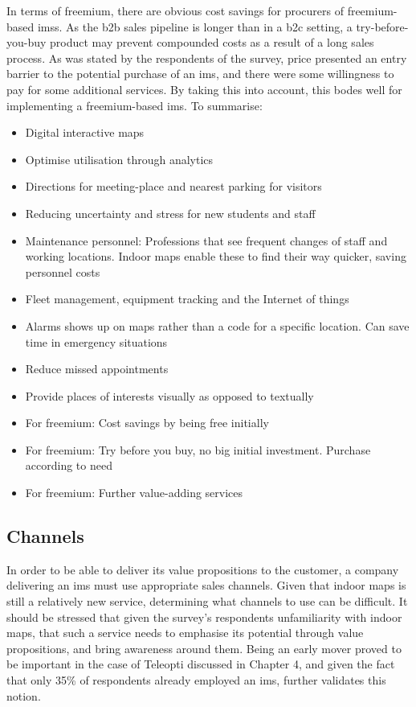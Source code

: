In terms of freemium, there are obvious cost savings for procurers of freemium-based \glspl{ims}. As the \gls{b2b} sales pipeline is longer than in a \gls{b2c} setting, a try-before-you-buy product may prevent compounded costs as a result of a long sales process. As was stated by the respondents of the survey, price presented an entry barrier to the potential purchase of an \gls{ims}, and there were some willingness to pay for some additional services. By taking this into account, this bodes well for implementing a freemium-based \gls{ims}. To summarise:

\begin{itemize}
    \item Digital interactive maps
    \item Optimise utilisation through analytics
    \item Directions for meeting-place and nearest parking for visitors
    \item Reducing uncertainty and stress for new students and staff
    \item Maintenance personnel: Professions that see frequent changes of staff and working locations. Indoor maps enable these to find their way quicker, saving personnel costs
    \item Fleet management, equipment tracking and the Internet of things
    \item Alarms shows up on maps rather than a code for a specific location. Can save time in emergency situations
    \item Reduce missed appointments
    \item Provide places of interests visually as opposed to textually
    \item For freemium: Cost savings by being free initially
    \item For freemium: Try before you buy, no big initial investment. Purchase according to need
    \item For freemium: Further value-adding services
\end{itemize}

\subsection{Channels}
In order to be able to deliver its value propositions to the customer, a company delivering an \gls{ims} must use appropriate sales channels. Given that indoor maps is still a relatively new service, determining what channels to use can be difficult. It should be stressed that given the survey's respondents unfamiliarity with indoor maps, that such a service needs to emphasise its potential through value propositions, and bring awareness around them. Being an early mover proved to be important in the case of Teleopti discussed in Chapter 4, and given the fact that only 35\% of respondents already employed an \gls{ims}, further validates this notion. 


